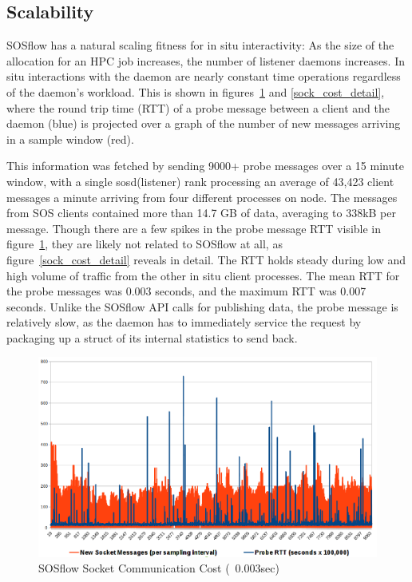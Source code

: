
\subsection{Scalability}

SOSflow has a natural scaling fitness for in situ interactivity: As
the size of the allocation for an HPC job increases, the number of
listener daemons increases.
%
In situ interactions with the daemon are nearly constant time
operations regardless of the daemon's workload.
%
This is shown in figures~\ref{sock_cost} and \ref{sock_cost_detail},
where the round trip time (RTT) of a probe message between a client
and the daemon (blue) is projected over a graph of the number of new
messages arriving in a sample window (red).

This information was fetched by sending 9000+ probe messages over a 15
minute window, with a single sosd(listener) rank processing an average
of 43,423 client messages a minute arriving from four different
processes on node.
%
The messages from SOS clients contained more than 14.7 GB of data,
averaging to 338kB per message.
%
Though there are a few spikes in the probe message RTT visible in
figure~\ref{sock_cost}, they are likely not related to SOSflow at all,
as figure~\ref{sock_cost_detail} reveals in detail.
%
The RTT holds steady during low and high volume of traffic from the
other in situ client processes.
%
The mean RTT for the probe messages was 0.003 seconds, and the maximum
RTT was 0.007 seconds.
%
Unlike the SOSflow API calls for publishing data, the probe message is
relatively slow, as the daemon has to immediately service the request
by packaging up a struct of its internal statistics to send back.

\begin{figure}[!t]
\centering
\includegraphics[width=5in]{images/icebox_api_cost_when_slam.png}
\caption{SOSflow Socket Communication Cost (~0.003sec)}
\label{sock_cost}
\end{figure}

